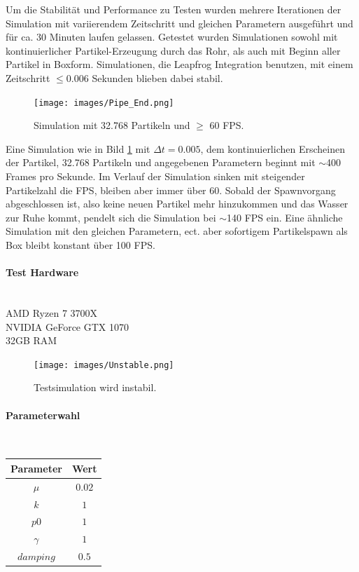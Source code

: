 \documentclass[a4paper]{paper}
\begin{document}
Um die Stabilität und Performance zu Testen wurden mehrere Iterationen der Simulation mit variierendem Zeitschritt und gleichen Parametern ausgeführt und für ca. 30 Minuten laufen gelassen. Getestet wurden Simulationen sowohl mit kontinuierlicher Partikel-Erzeugung durch das Rohr, als auch mit Beginn aller Partikel in Boxform. Simulationen, die Leapfrog Integration benutzen, mit einem Zeitschritt $\leq 0.006$ Sekunden blieben dabei stabil.

\begin{figure}[t]
	\centering
	\texttt{[image: images/Pipe\_End.png]}
	\caption{Simulation mit 32.768 Partikeln und $\geq$ 60 FPS.}
	\label{fig:final_simulation}
\end{figure}

 Eine  Simulation wie in Bild \ref{fig:final_simulation} mit $\Delta t = 0.005$, dem kontinuierlichen Erscheinen der Partikel, 32.768 Partikeln und angegebenen Parametern beginnt mit $\sim$400 Frames pro Sekunde. Im Verlauf der Simulation sinken mit steigender Partikelzahl die FPS, bleiben aber immer über 60. Sobald der Spawnvorgang abgeschlossen ist, also keine neuen Partikel mehr hinzukommen und das Wasser zur Ruhe kommt, pendelt sich die Simulation bei $\sim$140 FPS ein.
 Eine ähnliche Simulation mit den gleichen Parametern, ect. aber sofortigem Partikelspawn als Box bleibt konstant über 100 FPS.


\paragraph{Test Hardware}\mbox{}\\
AMD Ryzen 7 3700X \\
NVIDIA GeForce GTX 1070\\
32GB RAM\\


\begin{figure}[t]
	\centering
	\texttt{[image: images/Unstable.png]}
	\caption{Testsimulation wird instabil.}
	\label{fig:unstable}
\end{figure}


\paragraph{Parameterwahl}\mbox{}\\
\begin{center}
	\begin{tabular}{ c|c }
	\hline
	Parameter & Wert \\
	
	\hline
 	$\mu$ & $0.02$\\
	$k$ & $1$\\
	$p0$ & $1$\\
	$\gamma$ & $1$\\
$damping$& $0.5$\\
\hline
	\end{tabular}
\end{center}
\end{document}
